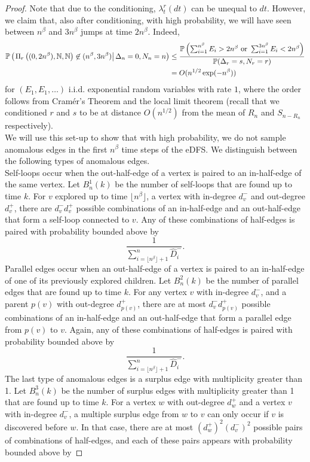 \begin{proof}
Note that due to the conditioning, $\lambda^r_t(dt)$ can be unequal to $dt$. However, we claim that, also after conditioning, with high probability, we will have seen between $n^\beta$ and $3n^\beta$ jumps at time $2n^{\beta}$. Indeed,
\begin{align}\begin{split}\label{eq.numberofjumpsinrandommeasure}{\mathbb P}\left(\left.\Pi_r\left((0,2n^{\beta}),{\mathbb N},{\mathbb N}\right)\not\in (n^\beta,3n^\beta)\right|\Delta_n=0, N_n=n\right)&\leq \frac{{\mathbb P}\left(\sum_{i=1}^{n^\beta}E_i>2n^{\beta}\text{ or }\sum_{i=1}^{3n^\beta}E_i<2n^{\beta}\right)}{{\mathbb P}(\Delta_r=s, N_r=r)}\\
&=O(n^{1/2}\exp(-n^\beta))\end{split}\end{align}
for $(E_1,E_1,\dots)$ i.i.d. exponential random variables with rate $1$, where the order follows from Cramér's Theorem and the local limit theorem (recall that we conditioned $r$ and $s$ to be at distance $O(n^{1/2})$ from the mean of $R_n$ and $S_{n-R_n}$ respectively). \\
We will use this set-up to show that with high probability, we do not sample anomalous edges in the first $n^\beta$ time steps of the eDFS. We distinguish between the following types of anomalous edges.\\
Self-loops occur when the out-half-edge of a vertex is paired to an in-half-edge of the same vertex.  Let $B^1_n(k)$ be the number of self-loops that are found up to time $k$. For $v$ explored up to time $\lfloor n^\beta\rfloor$, a vertex with in-degree $d^-_v$ and out-degree $d^+_v$, there are $d^-_v d^+_v$ possible combinations of an in-half-edge and an out-half-edge that form a self-loop connected to $v$. Any of these combinations of half-edges is paired with probability bounded above by 
$$\frac{1}{\sum_{i=\lfloor n^\beta \rfloor+1}^n\hat{D}^-_i}.$$
Parallel edges occur when an out-half-edge of a vertex is paired to an in-half-edge of one of its previously explored children. Let $B^2_n(k)$ be the number of parallel edges that are found up to time $k$. For any vertex $v$ with in-degree $d^-_v$, and a parent $p(v)$ with out-degree $d^+_{p(v)}$, there are at most $d^-_v d^+_{p(v)}$ possible combinations of an in-half-edge and an out-half-edge that form a parallel edge from $p(v)$ to $v$. Again, any of these combinations of half-edges is paired with probability bounded above by 
$$\frac{1}{\sum_{i=\lfloor n^\beta \rfloor+1}^n \hat{D}^-_i}.$$
The last type of anomalous edges is a surplus edge with multiplicity greater than 1. Let $B^3_n(k)$ be the number of surplus edges with multiplicity greater than 1 that are found up to time $k$. For a vertex $w$ with out-degree $d^+_w$ and a vertex $v$ with in-degree $d^-_v$, a multiple surplus edge from $w$ to $v$ can only occur if $v$ is discovered before $w$. In that case, there are at most $(d^+_w)^2(d^-_v)^2$ possible pairs of combinations of half-edges, and each of these pairs appears with probability bounded above by

\end{proof}
